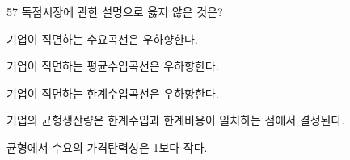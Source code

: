 \begin{question}{57}
독점시장에 관한 설명으로 옳지 않은 것은?
\begin{choices}
  \item 기업이 직면하는 수요곡선은 우하향한다.
  \item 기업이 직면하는 평균수입곡선은 우하향한다.
  \item 기업이 직면하는 한계수입곡선은 우하향한다.
  \item 기업의 균형생산량은 한계수입과 한계비용이 일치하는 점에서 결정된다.
  \item 균형에서 수요의 가격탄력성은 1보다 작다.
\end{choices}
\end{question}

